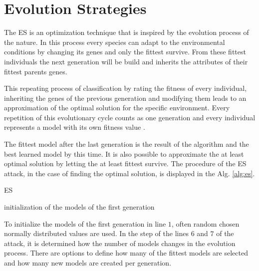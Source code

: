 \section{Evolution Strategies}
\label{sec:evolutionstrategies}

The \acf{ES} is an optimization technique that is inspired by the evolution process of the nature.
In this process every species can adapt to the environmental conditions by changing its genes and only the fittest survive.
From these fittest individuals the next generation will be build and inherits the attributes of their fittest parents genes. %

This repeating process of classification by rating the fitness of every individual, inheriting the genes of the previous generation and modifying them leads to an approximation of the optimal solution for the specific environment.
Every repetition of this evolutionary cycle counts as one generation and every individual represents a model with its own fitness value	\cite{Becker2015ThePUFs}. %

The fittest model after the last generation is the result of the algorithm and the best learned model by this time.
It is also possible to approximate the at least optimal solution by letting the at least fittest survive. %
The procedure of the \ac{ES} attack, in the case of finding the optimal solution, is displayed in the Alg. \ref{alg:es}.

\SetAlCapHSkip{0.2em}
\begin{algorithm}[H] %
\Indm
\SetAlgoLined
\caption{\acl{ES}}
\label{alg:es}
\Indp

initialization of the models of the first generation\\
\end{algorithm}

To initialize the models of the first generation in line $1$, often random chosen normally distributed values are used.
In the step of the lines $6$ and $7$ of the attack, it is determined how the number of models changes in the evolution process. %
There are options to define how many of the fittest models are selected and how many new models are created per generation.


